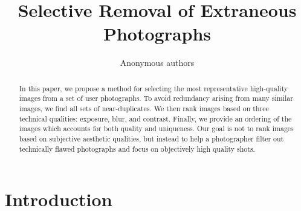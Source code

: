 \documentclass{sig-alternate}
\begin{document}

\title{
Selective Removal of Extraneous Photographs
}

\author{
\alignauthor
Anonymous authors
\and 
}

\maketitle	
\begin{abstract}
In this paper, we propose a method for selecting the most representative high-quality images from a set of user photographs. To avoid redundancy arising from many similar images, we find all sets of near-duplicates. We then rank images based on three technical qualities: exposure, blur, and contrast. Finally, we provide an ordering of the images which accounts for both quality and uniqueness. Our goal is not to rank images based on subjective aesthetic qualities, but instead to help a photographer filter out technically flawed photographs and focus on objectively high quality shots.
\end{abstract}




\section{Introduction}


\label{sec:intro}
\end{document}
